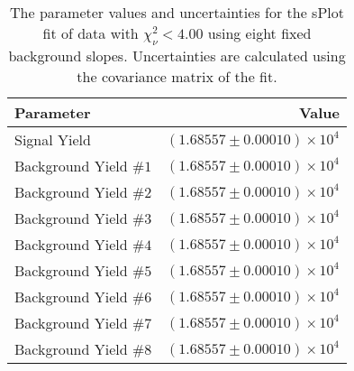 
\begin{table}[h]
    \begin{center}
        \begin{tabular}{lr}\toprule
            Parameter & Value \\\midrule
            Signal Yield & $(1.68557 \pm 0.00010) \times 10^{4}$ \\
            Background Yield $\#1$ & $(1.68557 \pm 0.00010) \times 10^{4}$ \\
            Background Yield $\#2$ & $(1.68557 \pm 0.00010) \times 10^{4}$ \\
            Background Yield $\#3$ & $(1.68557 \pm 0.00010) \times 10^{4}$ \\
            Background Yield $\#4$ & $(1.68557 \pm 0.00010) \times 10^{4}$ \\
            Background Yield $\#5$ & $(1.68557 \pm 0.00010) \times 10^{4}$ \\
            Background Yield $\#6$ & $(1.68557 \pm 0.00010) \times 10^{4}$ \\
            Background Yield $\#7$ & $(1.68557 \pm 0.00010) \times 10^{4}$ \\
            Background Yield $\#8$ & $(1.68557 \pm 0.00010) \times 10^{4}$ \\\bottomrule
        \end{tabular}
        \caption{The parameter values and uncertainties for the sPlot fit of data with $\chi^2_\nu < 4.00$ using eight fixed background slopes. Uncertainties are calculated using the covariance matrix of the fit.}
    \end{center}
\end{table}
